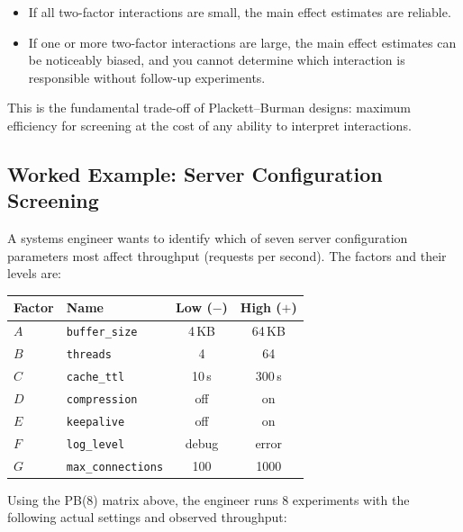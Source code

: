 \documentclass[11pt]{book}
\begin{document}
\begin{itemize}[nosep]
\item If all two-factor interactions are small, the main effect estimates are
      reliable.
\item If one or more two-factor interactions are large, the main effect estimates
      can be noticeably biased, and you cannot determine which interaction is
      responsible without follow-up experiments.
\end{itemize}

This is the fundamental trade-off of Plackett--Burman designs: maximum
efficiency for screening at the cost of any ability to interpret interactions.

\subsection{Worked Example: Server Configuration Screening}

A systems engineer wants to identify which of seven server configuration
parameters most affect throughput (requests per second). The factors and their
levels are:

\begin{center}
\begin{tabular}{llcc}
\toprule
Factor & Name & Low ($-$) & High ($+$) \\
\midrule
$A$ & \texttt{buffer\_size} & 4\,KB & 64\,KB \\
$B$ & \texttt{threads} & 4 & 64 \\
$C$ & \texttt{cache\_ttl} & 10\,s & 300\,s \\
$D$ & \texttt{compression} & off & on \\
$E$ & \texttt{keepalive} & off & on \\
$F$ & \texttt{log\_level} & debug & error \\
$G$ & \texttt{max\_connections} & 100 & 1000 \\
\bottomrule
\end{tabular}
\end{center}

\noindent Using the PB(8) matrix above, the engineer runs 8 experiments with
the following actual settings and observed throughput:
\end{document}
